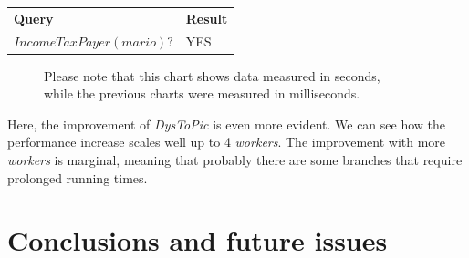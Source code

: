 \documentclass[a4paper, 11pt, oneside]{duthesis}
\begin{document}
\begin{tabular}{ll}
\textbf{Query} & \textbf{Result}\\
$IncomeTaxPayer(mario)?$ & YES\\
\end{tabular}

\begin{figure}[ht]
\begin{bchart}[step=400,max=400,unit=s,scale=1.4]
    \medskip
    \medskip
    \medskip
    \medskip
\end{bchart}
\caption{Please note that this chart shows data measured in seconds,\\while the previous charts were measured in milliseconds.}
\end{figure}

Here, the improvement of \emph{DysToPic} is even more evident. We can see how the performance increase scales well up to 4 \emph{workers}. The improvement with more \emph{workers} is marginal, meaning that probably there are some branches that require prolonged running times.

\chapter{Conclusions and future issues}

% 





\end{document}

